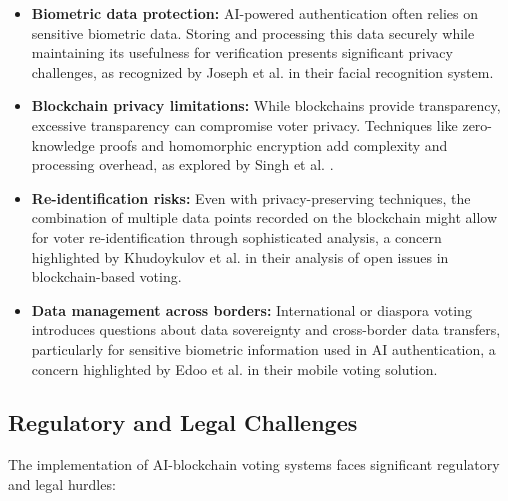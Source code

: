 \documentclass[conference]{IEEEtran}
\begin{document}
\begin{itemize}
    \item \textbf{Biometric data protection:} AI-powered authentication often relies on sensitive biometric data. Storing and processing this data securely while maintaining its usefulness for verification presents significant privacy challenges, as recognized by Joseph et al. \cite{b6} in their facial recognition system.
    
    \item \textbf{Blockchain privacy limitations:} While blockchains provide transparency, excessive transparency can compromise voter privacy. Techniques like zero-knowledge proofs and homomorphic encryption add complexity and processing overhead, as explored by Singh et al. \cite{b5}.
    
    \item \textbf{Re-identification risks:} Even with privacy-preserving techniques, the combination of multiple data points recorded on the blockchain might allow for voter re-identification through sophisticated analysis, a concern highlighted by Khudoykulov et al. \cite{b1} in their analysis of open issues in blockchain-based voting.
    
    \item \textbf{Data management across borders:} International or diaspora voting introduces questions about data sovereignty and cross-border data transfers, particularly for sensitive biometric information used in AI authentication, a concern highlighted by Edoo et al. \cite{b7} in their mobile voting solution.
\end{itemize}

\subsection{Regulatory and Legal Challenges}
The implementation of AI-blockchain voting systems faces significant regulatory and legal hurdles:
\end{document}
